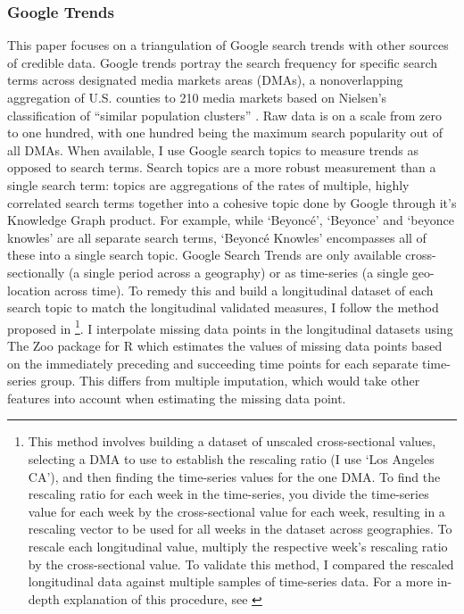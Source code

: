 \subsubsection{Google Trends}
This paper focuses on a triangulation of Google search trends
\citep{googletrends} with other sources of credible data. Google trends portray
the search frequency for specific search terms across designated media markets
areas (DMAs), a nonoverlapping aggregation of U.S. counties to 210 media markets
based on Nielsen's classification of ``similar population clusters''
\citep{dma_key}. Raw data is on a scale from zero to one hundred, with one
hundred being the maximum search popularity out of all DMAs. When available, I
use Google search topics to measure trends as opposed to search terms. Search
topics are a more robust measurement than a single search term: topics are
aggregations of the rates of multiple, highly correlated search terms together
into a cohesive topic done by Google through it's Knowledge Graph product. For
example, while `Beyoncé', `Beyonce' and `beyonce knowles' are all separate
search terms, `Beyoncé Knowles' encompasses all of these into a single search
topic. Google Search Trends are only available cross-sectionally (a single
period across a geography) or as time-series (a single geo-location across
time). To remedy this and build a longitudinal dataset of each search topic to
match the longitudinal validated measures, I follow the method proposed in
\citet[][p. 5]{park_etal}\footnote{This method involves building a dataset of
unscaled cross-sectional values, selecting a DMA to use to establish the
rescaling ratio (I use `Los Angeles CA'), and then finding the time-series
values for the one DMA. To find the rescaling ratio for each week in the
time-series, you divide the time-series value for each week by the
cross-sectional value for each week, resulting in a rescaling vector to be used
for all weeks in the dataset across geographies. To rescale each longitudinal
value, multiply the respective week's rescaling ratio by the cross-sectional
value. To validate this method, I compared the rescaled longitudinal data
against multiple samples of time-series data. For a more in-depth explanation of
this procedure, see \citet[p. 5]{park_etal}}. I interpolate missing data points
in the longitudinal datasets using The Zoo package for R \citep{zoo} which estimates
the values of missing data points based on the immediately preceding and succeeding
time points for each separate time-series group. This differs from multiple imputation, 
which would take other features into account when estimating the missing data point. 

